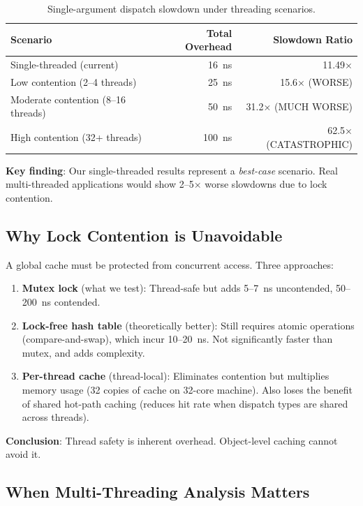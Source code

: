 \documentclass[sigplan,final]{acmart}
\begin{document}
\begin{table}[h]
\centering
\caption{Single-argument dispatch slowdown under threading scenarios.}
\label{tab:threading-slowdown}
\begin{tabular}{@{}lrr@{}}
\toprule
\textbf{Scenario} & \textbf{Total Overhead} & \textbf{Slowdown Ratio} \\
\midrule
Single-threaded (current) & 16~ns & 11.49× \\
Low contention (2--4 threads) & 25~ns & 15.6× (WORSE) \\
Moderate contention (8--16 threads) & 50~ns & 31.2× (MUCH WORSE) \\
High contention (32+ threads) & 100~ns & 62.5× (CATASTROPHIC) \\
\bottomrule
\end{tabular}
\end{table}

\textbf{Key finding}: Our single-threaded results represent a \emph{best-case} scenario. Real
multi-threaded applications would show 2--5× worse slowdowns due to lock contention.

\subsection{Why Lock Contention is Unavoidable}

A global cache must be protected from concurrent access. Three approaches:

\begin{enumerate}
  \item \textbf{Mutex lock} (what we test): Thread-safe but adds 5--7~ns uncontended, 50--200~ns contended.

  \item \textbf{Lock-free hash table} (theoretically better): Still requires atomic operations
    (compare-and-swap), which incur 10--20~ns. Not significantly faster than mutex, and adds complexity.

  \item \textbf{Per-thread cache} (thread-local): Eliminates contention but multiplies memory usage
    (32 copies of cache on 32-core machine). Also loses the benefit of shared hot-path caching
    (reduces hit rate when dispatch types are shared across threads).
\end{enumerate}

\textbf{Conclusion}: Thread safety is inherent overhead. Object-level caching cannot avoid it.

\subsection{When Multi-Threading Analysis Matters}
\end{document}
